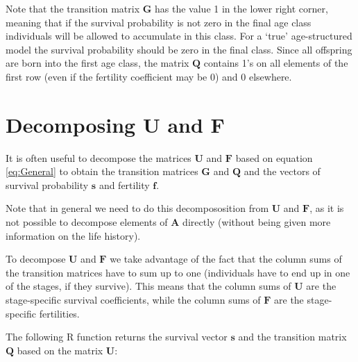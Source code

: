 \documentclass[
]{book}
\begin{document}
Note that the transition matrix \(\mathbf{G}\) has the value 1 in the lower right corner, meaning that if the survival probability is not zero in the final age class individuals will be allowed to accumulate in this class. For a `true' age-structured model the survival probability should be zero in the final class. Since all offspring are born into the first age class, the matrix \(\mathbf{Q}\) contains 1's on all elements of the first row (even if the fertility coefficient may be 0) and 0 elsewhere.

\hypertarget{decomposing-mathbfu-and-mathbff}{%
\section{\texorpdfstring{Decomposing \(\mathbf{U}\) and \(\mathbf{F}\)}{Decomposing \textbackslash mathbf\{U\} and \textbackslash mathbf\{F\}}}\label{decomposing-mathbfu-and-mathbff}}

It is often useful to decompose the matrices \(\mathbf{U}\) and \(\mathbf{F}\) based on equation \eqref{eq:General} to obtain the transition matrices \(\mathbf{G}\) and \(\mathbf{Q}\) and the vectors of survival probability \(\mathbf{s}\) and fertility \(\mathbf{f}\).

Note that in general we need to do this decompososition from \(\mathbf{U}\) and \(\mathbf{F}\), as it is not possible to decompose elements of \(\mathbf{A}\) directly (without being given more information on the life history).

To decompose \(\mathbf{U}\) and \(\mathbf{F}\) we take advantage of the fact that the column sums of the transition matrices have to sum up to one (individuals have to end up in one of the stages, if they survive). This means that the column sums of \(\mathbf{U}\) are the stage-specific survival coefficients, while the column sums of \(\mathbf{F}\) are the stage-specific fertilities.

The following R function returns the survival vector \(\mathbf{s}\) and the transition matrix \(\mathbf{Q}\) based on the matrix \(\mathbf{U}\):
\end{document}
